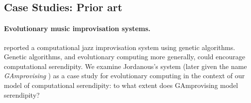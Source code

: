 




\subsection{Case Studies: Prior art}
\label{sec:priorart}

\paragraph{Evolutionary music improvisation systems.}

 reported a computational jazz improvisation system using genetic algorithms. Genetic algorithms, and evolutionary computing more generally, could encourage computational serendipity. We examine Jordanous's system (later given the name {\em GAmprovising} \cite{jordanous:12}) as a case study for evolutionary computing in the context of our model of computational serendipity: to what extent does GAmprovising model serendipity?

